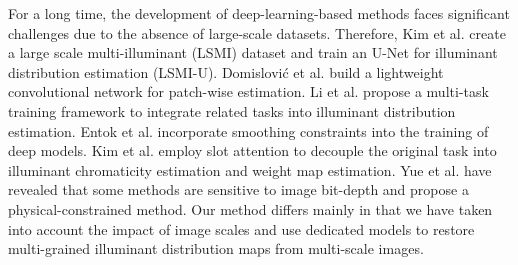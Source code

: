 For a long time, the development of deep-learning-based methods faces significant challenges due to the absence of large-scale datasets. Therefore, Kim et al. \cite{kim_large_2021} create a large scale multi-illuminant (LSMI) dataset and train an U-Net for illuminant distribution estimation (LSMI-U). Domislović et al. \cite{domislovic_color_2023} build a lightweight convolutional network for patch-wise estimation. Li et al. \cite{li_mimt_2023} propose a multi-task training framework to integrate related tasks into illuminant distribution estimation. Entok et al. \cite{entok_pixel-wise_2024} incorporate smoothing constraints into the training of deep models. Kim et al. \cite{kim_attentive_2024} employ slot attention to decouple the original task into illuminant chromaticity estimation and weight map estimation. Yue et al. \cite{yue_robust_2024} have revealed that some methods are sensitive to image bit-depth and propose a physical-constrained method. Our method differs mainly in that we have taken into account the impact of image scales and use dedicated models to restore multi-grained illuminant distribution maps from multi-scale images.